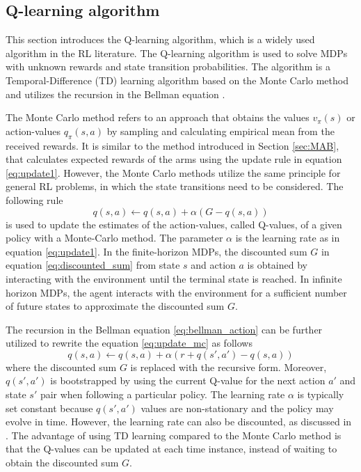 \documentclass[english, 12pt, a4paper, elec, utf8, a-1b, online]{aaltothesis}
\numberwithin{equation}{section}
\begin{document}
\subsection{Q-learning algorithm}\label{sec:q_learning}

This section introduces the Q-learning algorithm, which is a widely used algorithm in the RL literature.
The Q-learning algorithm is used to solve MDPs with unknown rewards and state transition probabilities.
The algorithm is a Temporal-Difference (TD) learning algorithm based on the Monte Carlo method and utilizes the recursion in the Bellman equation \cite{Sutton2018}.

The Monte Carlo method refers to an approach that obtains the values $v_\pi(s)$ or action-values $q_\pi(s, a)$ by sampling and calculating empirical mean from the received rewards. 
It is similar to the method introduced in Section \ref{sec:MAB}, that calculates expected rewards of the arms using the update rule in equation \eqref{eq:update1}. 
However, the Monte Carlo methods utilize the same principle for general RL problems, in which the state transitions need to be considered. 
The following rule \cite{Sutton2018}
\begin{equation}\label{eq:update_mc}
    q(s, a) \leftarrow q(s, a) + \alpha (G - q(s, a))
\end{equation}
is used to update the estimates of the action-values, called Q-values, of a given policy with a Monte-Carlo method.
The parameter $\alpha$ is the learning rate as in equation \eqref{eq:update1}.
In the finite-horizon MDPs, the discounted sum $G$ in equation \eqref{eq:discounted_sum} from state $s$ and action $a$ is obtained by interacting with the environment until the terminal state is reached.   
In infinite horizon MDPs, the agent interacts with the environment for a sufficient number of future states to approximate the discounted sum $G$.


The recursion in the Bellman equation \eqref{eq:bellman_action} can be further utilized to rewrite the equation \eqref{eq:update_mc} as follows \cite{Sutton2018}
\begin{equation}\label{eq:update_td}
    q(s, a) \leftarrow q(s, a) + \alpha \left( r + q(s', a') - q(s, a) \right)
\end{equation}
where the discounted sum $G$ is replaced with the recursive form.
Moreover, $q(s', a')$ is bootstrapped by using the current Q-value for the next action $a'$ and state $s'$ pair when following a particular policy.
The learning rate $\alpha$ is typically set constant because $q(s', a')$ values are non-stationary and the policy may evolve in time.
However, the learning rate can also be discounted, as discussed in \cite{Even-Dar2003}.
The advantage of using TD learning compared to the Monte Carlo method is that the Q-values can be updated at each time instance, instead of waiting to obtain the discounted sum $G$.
\end{document}
